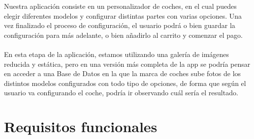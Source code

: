 Nuestra aplicación consiste en un personalizador de coches, en el cual puedes elegir diferentes modelos y configurar distintas partes con varias opciones. Una vez finalizado el proceso de configuración, el usuario podrá o bien guardar la configuración para más adelante, o bien añadirlo al carrito y comenzar el pago.
\\\\
En esta etapa de la aplicación, estamos utilizando una galería de imágenes reducida y estática, pero en una versión más completa de la app se podría pensar en acceder a una Base de Datos en la que la marca de coches sube fotos de los distintos modelos configurados con todo tipo de opciones, de forma que según el usuario va configurando el coche, podría ir observando cuál sería el resultado.



\section{Requisitos funcionales}

